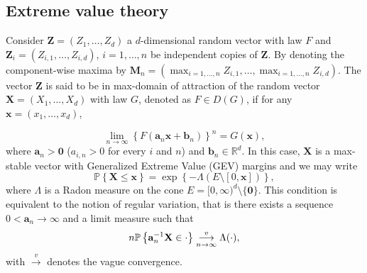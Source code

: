 \documentclass[11pt]{article}
\theoremstyle{definition}
\begin{document}
	\subsection{Extreme value theory} 
	
	Consider $\textbf{Z}= (Z_1,\dots, Z_d)$ a $d$-dimensional random vector with law $F$ and $\textbf{Z}_{i} = (Z_{i,1},\dots, Z_{i,d})$, $i = 1,\dots,n$ be independent copies of $\textbf{Z}$. By denoting the component-wise maxima by $\textbf{M}_n = (\max_{i=1,\dots,n} Z_{i,1}, \dots, \max_{i=1,\dots,n} Z_{i,d})$. The vector $\textbf{Z}$ is said to be in max-domain of attraction of the random vector $\textbf{X} = (X_1, \dots, X_d)$ with law $G$, denoted as $F \in D(G)$, if for any $\textbf{x} = (x_1,\dots,x_d)$,
	
	\begin{equation}
		\label{eq:domain_attraction}
		\underset{n \rightarrow \infty}{\lim} \left\{ F(\textbf{a}_n \textbf{x} + \textbf{b}_n) \right\}^n = G(\textbf{x}),
	\end{equation}
	where $\textbf{a}_n > \textbf{0}$ ($a_{i,n} > 0$ for every $i$ and $n$) and $\textbf{b}_n \in \mathbb{R}^d$. In this case, $\textbf{X}$ is a max-stable vector with Generalized Extreme Value (GEV) margins and we may write
	\begin{equation*}
		\mathbb{P}\left\{ \textbf{X} \leq \textbf{x}\right\} = \exp \left\{ -\Lambda(E \setminus [0,\textbf{x}]) \right\},
	\end{equation*}
	where $\Lambda$ is a Radon measure on the cone $E = [0,\infty)^d \setminus \{\textbf{0}\}$. This condition is equivalent to the notion of regular variation, that is there exists a sequence $0 < \textbf{a}_n \rightarrow \infty$ and a limit measure such that
	\begin{equation*}
		n \mathbb{P}\left\{ \textbf{a}_n^{-1} \textbf{X} \in \cdot \right\} \overunderset{v}{n \rightarrow \infty}{\longrightarrow} \Lambda(\cdot),
	\end{equation*}
	with $\overset{v}{\rightarrow}$ denotes the vague convergence.
	
\end{document}

